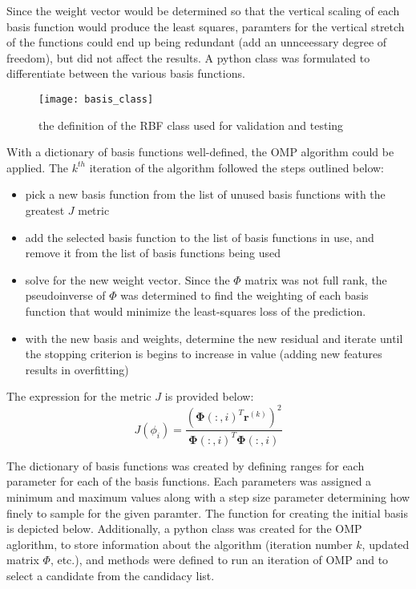 Since the weight vector would be determined so that the vertical scaling of each basis function would produce the least squares, paramters for the vertical stretch of the functions could end up being redundant (add an unnceessary degree of freedom), but did not affect the results. A python class was formulated to differentiate between the various basis functions.

\begin{figure}[H]
\centering
\texttt{[image: basis\_class]}
\caption{the definition of the RBF class used for validation and testing}
\end{figure}

With a dictionary of basis functions well-defined, the OMP algorithm could be applied. The $k^{th}$ iteration of the algorithm followed the steps outlined below:

\begin{itemize}
\item pick a new basis function from the list of unused basis functions with the greatest $J$ metric
\item add the selected basis function to the list of basis functions in use, and remove it from the list of basis functions being used
\item solve for the new weight vector. Since the $\Phi$ matrix was not full rank, the pseudoinverse of $\Phi$ was determined to find the weighting of each basis function that would minimize the least-squares loss of the prediction.
\item with the new basis and weights, determine the new residual and iterate until the stopping criterion is begins to increase in value (adding new features results in overfitting)
\end{itemize}

The expression for the metric $J$ is provided below:
\begin{equation}
J(\phi_i) = \frac{(\mathbf{\Phi}(:,i)^T\mathbf{r}^{(k)})^2}{\mathbf{\Phi}(:,i)^T\mathbf{\Phi}(:,i)}
\end{equation}

The dictionary of basis functions was created by defining ranges for each parameter for each of the basis functions. Each parameters was assigned a minimum and maximum values along with a step size parameter determining how finely to sample for the given paramter. The function for creating the initial basis is depicted below. Additionally, a python class was created for the OMP aglorithm, to store  information about the algorithm (iteration number $k$, updated matrix $\Phi$, etc.), and methods were defined to run an iteration of OMP and to select a candidate from the candidacy list.


